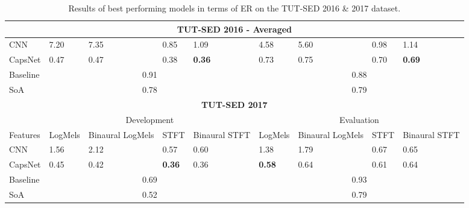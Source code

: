 \begin{table}[h]
{\begin{tabular}{@{}lllllllll@{}}
			\midrule
			\multicolumn{9}{c}{\textbf{TUT-SED 2016 - Averaged}}                                                                                         \\ \midrule
			CNN     & 7.20      & 7.35               & 0.85 & \multicolumn{1}{l|}{1.09}        & 4.58      & 5.60               & 0.98 & 1.14       \\
			CapsNet & 0.47      & 0.47               & 0.38 & \multicolumn{1}{l|}{\textbf{0.36}}        & 0.73      & 0.75               & 0.70 & \textbf{0.69}       \\
			\midrule
			Baseline \cite{mesaros2016tut}      & \multicolumn{4}{c|}{0.91}                                                & \multicolumn{4}{c}{0.88}                            \\
			SoA \cite{valenti2017neural}          & \multicolumn{4}{c|}{0.78}                                                & \multicolumn{4}{c}{0.79}                            \\ \bottomrule
			\toprule
			\multicolumn{9}{c}{\textbf{TUT-SED 2017}}                                                                                                                                  \\ \midrule
			& \multicolumn{4}{c|}{Development}                                                          & \multicolumn{4}{c}{Evaluation}                                      \\ \midrule
			Features & LogMels & Binaural  LogMels & STFT & \multicolumn{1}{l|}{Binaural STFT} & LogMels & Binaural LogMels & STFT & Binaural STFT \\ \midrule
			CNN      & 1.56             & 2.12                       & 0.57 & \multicolumn{1}{l|}{0.60}          & 1.38             & 1.79                      & 0.67 & 0.65        \\
			CapsNet  & 0.45             & 0.42                       & \textbf{0.36} & \multicolumn{1}{l|}{0.36} &\textbf{0.58}            & 0.64                      & 0.61 & 0.64 \\ 
			\midrule
			Baseline \cite{DCASE2017challenge} & \multicolumn{4}{c|}{0.69}							& \multicolumn{4}{c}{0.93} \\
			SoA \cite{adavanne2017report}     & \multicolumn{4}{c|}{0.52}             				& \multicolumn{4}{c}{0.79}  \\ \bottomrule
		\end{tabular}
	}
	\caption{Results of best performing models in terms of ER on the TUT-SED 2016 \& 2017 dataset.}		
	\label{tbl:results-dcase2016}
\end{table}


